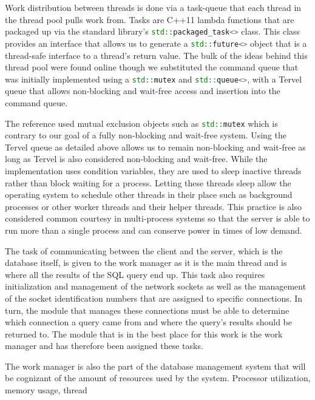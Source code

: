 \documentclass[letterpaper, 12pt]{article}
\newcommand{\inlinecode}[1]{\colorbox{codegrey}{\lstinline[language=C++]{#1}}}
\begin{document}
Work distribution between threads is done via a task-queue that each thread in the
thread pool pulls work from. Tasks are C++11 lambda functions that are packaged up
via the standard library's \inlinecode{std::packaged_task<>}
 class.
This class provides an interface that allows us to generate a \inlinecode{std::future<>}
object that is a thread-safe interface to a thread's return value. The bulk of the
ideas behind this thread pool were found online \cite{stackoverflow1} though we substituted
the command queue that was initially implemented using a \inlinecode{std::mutex}
and \inlinecode{std::queue<>}, with a Tervel queue that allows
non-blocking and wait-free access and insertion into the command queue.
\par\vspace{\baselineskip}
The reference used mutual exclusion objects such as \inlinecode{std::mutex}
which is contrary to our goal of a fully non-blocking and wait-free system. Using the Tervel
queue as detailed above allows us to remain non-blocking and wait-free as long as Tervel
is also considered non-blocking and wait-free. While the implementation uses condition variables,
they are used to sleep inactive threads rather than block waiting for a process. Letting these
threads sleep allow the operating system to schedule other threads in their place such as
background processes or other worker threads and their helper threads. This practice is also
considered common courtesy in multi-process systems so that the server is able to run more than
a single process and can conserve power in times of low demand.
\par\vspace{\baselineskip}
The task of communicating between the client and the server, which is the database itself,
is given to the work manager as it is the main thread and is where all the results of
the SQL query end up. This task also requires initialization and management of the network
sockets as well as the management of the socket identification numbers that are assigned
to specific connections. In turn, the module that manages these connections must be able to
determine which connection a query came from and where the query's results should be
returned to. The module that is in the best place for this work is the work manager
and has therefore been assigned these tasks.
\par\vspace{\baselineskip}
The work manager is also the part of the database management system that will be cognizant
of the amount of resources used by the system. Processor utilization, memory usage, thread
\end{document}
